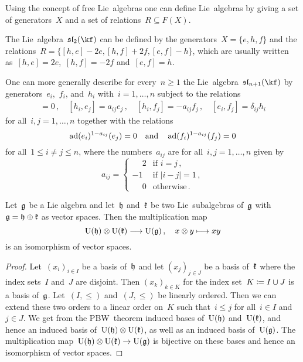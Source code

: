 \begin{remark}
  Using the concept of free Lie~algebras one can define Lie~algebras by giving a set of generators~$X$ and a set of relations~$R \subseteq F(X)$.
\end{remark}


\begin{example}
  The Lie~algebra~$\sllie_2(\kf)$ can be defined by the generators~$X = \{e, h, f\}$ and the relations~$R = \{[h,e] - 2e, [h,f] + 2f, [e,f] - h\}$, which are usually written as~$[h,e] = 2e$,~$[h,f] = -2f$ and~$[e,f] = h$.
  
  One can more generally describe for every~$n \geq 1$ the Lie~algebra~$\sllie_{n+1}(\kf)$ by generators~$e_i$,~$f_i$, and~$h_i$ with~$i = 1, \dotsc, n$ subject to the relations
  \begin{align*}
    [h_i, h_j] = 0  \,,
    \quad
    [h_i, e_j] = a_{ij} e_j \,,
    \quad
    [h_i, f_j] = -a_{ij}f_j  \,,
    \quad
    [e_i, f_j] = \delta_{ij} h_i
  \end{align*}
  for all~$i,j = 1, \dotsc, n$ together with the relations
  \[
    \operatorname{ad}(e_i)^{1-a_{ij}}(e_j) = 0
    \quad\text{and}\quad
    \operatorname{ad}(f_i)^{1-a_{ij}}(f_j) = 0
  \]
  for all~$1 \leq i \neq j \leq n$, where the numbers~$a_{ij}$ are for all~$i,j = 1, \dotsc, n$ given by
  \[
    a_{ij} =
    \begin{cases}
    \phantom{-}2 & \text{if $i = j$}  \,, \\
              -1 & \text{if $|i-j| = 1$}  \,, \\
    \phantom{-}0 & \text{otherwise} \,.
    \end{cases}
  \]
\end{example}


\begin{corollary}
  \label{uea of direct sum of subspaces}
  Let~$\mathfrak{g}$ be a Lie algebra and let~$\mathfrak{h}$ and~$\mathfrak{k}$ be two Lie~subalgebras of~$\mathfrak{g}$ with~$\mathfrak{g} = \mathfrak{h} \oplus \mathfrak{k}$ as vector spaces.
  Then the multiplication map
  \[
    \Univ(\hlie) \tensor \Univ(\klie)
    \to
    \Univ(\glie) \,,
    \quad
    x \tensor y
    \mapsto
    xy
  \]
  is an isomorphism of vector spaces.
\end{corollary}


\begin{proof}
  Let~$(x_i)_{i \in I}$ be a basis of~$\mathfrak{h}$ and let $(x_j)_{j \in J}$ be a basis of~$\mathfrak{k}$ where the index sets~$I$ and~$J$ are disjoint.
  Then $(x_k)_{k \in K}$ for the index set~$K \coloneqq I \cup J$ is a basis of~$\mathfrak{g}$.
  Let~$(I, \leq)$ and~$(J, \leq)$ be linearly ordered.
  Then we can extend these two orders to a linear order on~$K$ such that~$i \leq j$ for all~$i \in I$ and~$j \in J$.
  We get from the PBW~theorem induced bases of~$\operatorname{U}(\mathfrak{h})$ and~$\operatorname{U}(\mathfrak{k})$, and hence an induced basis of~$\operatorname{U}(\mathfrak{h}) \otimes \operatorname{U}(\mathfrak{k})$, as well as an induced basis of~$\operatorname{U}(\mathfrak{g})$.
  The multiplication map~$\Univ(\hlie) \tensor \Univ(\klie) \to \Univ(\glie)$ is bijective on these bases and hence an isomorphism of vector spaces.
\end{proof}


